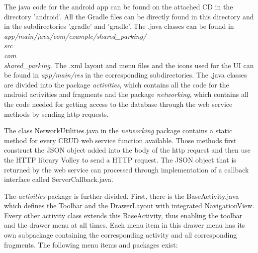 The java code for the android app can be found on the attached CD in the directory 'android'. All the Gradle files can be directly found in this directory and in the subdirectories '.gradle' and 'gradle'. The .java classes can be found in \textit{app/main/java/com/example/shared\_parking/\\src\\com\\shared\_parking}. The .xml layout and menu files and the icons used for the UI can be found in \textit{app/main/res} in the corresponding subdirectories. The .java classes are divided into the package \textit{activities}, which contains all the code for the android activities and fragments and the package \textit{networking}, which contains all the code needed for getting access to the database through the web service methods by sending http requests.

The class NetworkUtilities.java in the \textit{networking} package contains a static method for every CRUD web service function available. Those methods first construct the JSON object added into the body of the http request and then use the HTTP library Volley to send a HTTP request. The JSON object that is returned by the web service can processed through implementation of a callback interface called ServerCallback.java.

The \textit{activities} package is further divided. First, there is the BaseActivity.java which defines the Toolbar and the DrawerLayout with integrated NavigationView. Every other activity class extends this BaseActivity, thus enabling the toolbar and the drawer menu at all times. Each menu item in this drawer menu has its own subpackage containing the corresponding activity and all corresponding fragments. The following menu items and packages exist:


